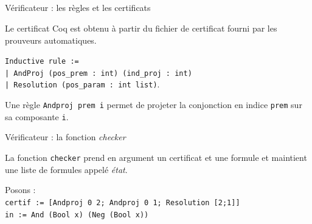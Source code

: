 \documentclass{beamer}
\begin{document}
    \subsection{}
    \begin{frame}{Vérificateur : les règles et les certificats}


      Le certificat Coq est obtenu à partir du fichier de certificat fourni par les prouveurs automatiques.

      \vspace{0.5cm}
      
      \texttt{Inductive rule :=}\\
      \texttt{| AndProj (pos\_prem\,:\,int) (ind\_proj\,:\,int)}\\
      \texttt{| Resolution (pos\_param\,:\,int list)}.


      \vspace{0.5cm}

      Une règle \texttt{Andproj prem i} permet de projeter la conjonction en indice \texttt{prem} sur sa composante \texttt{i}.

    \end{frame}

    \begin{frame}{Vérificateur : la fonction \textit{checker}}

      La fonction \texttt{checker} prend en argument un certificat et une formule et maintient une liste de formules appelé \textit{état}.

      \vspace {0.3cm}

      Posons : \\
      \texttt{certif := [Andproj 0 2; Andproj 0 1; Resolution\,[2;1]]}\\
      \texttt{in := And (Bool x) (Neg (Bool x))}\\
      \vspace{0.3cm}

      \vspace{1mm}

      \vspace{1mm}

      \vspace{1mm}
    \end{frame}
\end{document}
